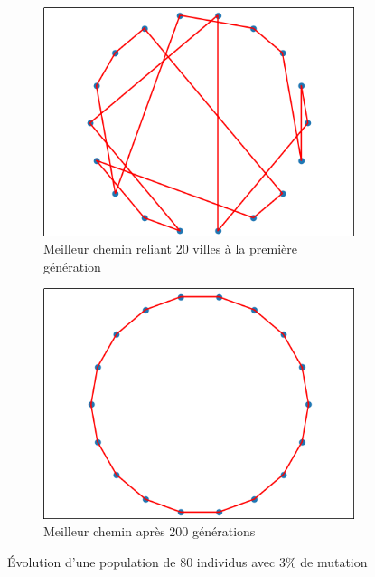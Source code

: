 \documentclass[11pt]{article}
\begin{document}
\begin{figure}[h]
    \begin{subfigure}{.5\textwidth}
        \includegraphics[width=.9\linewidth]{./gen1.png}
        \caption{Meilleur chemin reliant 20 villes à la première génération}
    \end{subfigure}
    \begin{subfigure}{.5\textwidth}
        \includegraphics[width=.9\linewidth]{./gen200.png}
        \caption{Meilleur chemin après 200 générations
        }
    \end{subfigure}
    \caption{Évolution d'une population de 80 individus avec 3\% de mutation}
\end{figure}
\end{document}
